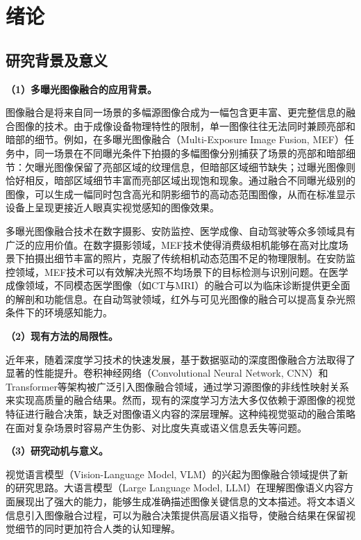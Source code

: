 \section{绪论}\label{ch:introduction}

\subsection{研究背景及意义}\label{sec:background}

\textbf{（1）多曝光图像融合的应用背景。}

图像融合是将来自同一场景的多幅源图像合成为一幅包含更丰富、更完整信息的融合图像的技术。由于成像设备物理特性的限制，单一图像往往无法同时兼顾亮部和暗部的细节。例如，在多曝光图像融合（Multi-Exposure Image Fusion, MEF）任务中，同一场景在不同曝光条件下拍摄的多幅图像分别捕获了场景的亮部和暗部细节：欠曝光图像保留了亮部区域的纹理信息，但暗部区域细节缺失；过曝光图像则恰好相反，暗部区域细节丰富而亮部区域出现饱和现象。通过融合不同曝光级别的图像，可以生成一幅同时包含高光和阴影细节的高动态范围图像，从而在标准显示设备上呈现更接近人眼真实视觉感知的图像效果。

多曝光图像融合技术在数字摄影、安防监控、医学成像、自动驾驶等众多领域具有广泛的应用价值。在数字摄影领域，MEF技术使得消费级相机能够在高对比度场景下拍摄出细节丰富的照片，克服了传统相机动态范围不足的物理限制。在安防监控领域，MEF技术可以有效解决光照不均场景下的目标检测与识别问题。在医学成像领域，不同模态医学图像（如CT与MRI）的融合可以为临床诊断提供更全面的解剖和功能信息。在自动驾驶领域，红外与可见光图像的融合可以提高复杂光照条件下的环境感知能力。

\textbf{（2）现有方法的局限性。}

近年来，随着深度学习技术的快速发展，基于数据驱动的深度图像融合方法取得了显著的性能提升。卷积神经网络（Convolutional Neural Network, CNN）和Transformer等架构被广泛引入图像融合领域，通过学习源图像的非线性映射关系来实现高质量的融合结果。然而，现有的深度学习方法大多仅依赖于源图像的视觉特征进行融合决策，缺乏对图像语义内容的深层理解。这种纯视觉驱动的融合策略在面对复杂场景时容易产生伪影、对比度失真或语义信息丢失等问题。

\textbf{（3）研究动机与意义。}

视觉语言模型（Vision-Language Model, VLM）的兴起为图像融合领域提供了新的研究思路。大语言模型（Large Language Model, LLM）在理解图像语义内容方面展现出了强大的能力，能够生成准确描述图像关键信息的文本描述。将文本语义信息引入图像融合过程，可以为融合决策提供高层语义指导，使融合结果在保留视觉细节的同时更加符合人类的认知理解。

